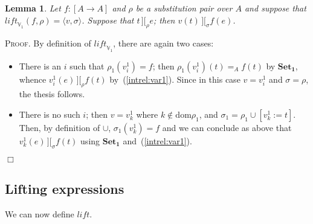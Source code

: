 \documentclass{article}
\newtheorem{lemma}[definition]{Lemma}
\newenvironment{proof}{\smallskip\textsc{Proof.}}{\hspace*{\fill}$\Box$}
\newcommand{\intII}{\,]\![}
\newcommand{\intrel}{\mathbin{\intII_{\rho}}}
\newcommand{\V}{{\mathbb V}}
\newcommand{\axiom}[1]{\ensuremath{\mathbf{#1}}}
\newcommand{\liftv}[1]{\ensuremath{\mathit{lift}_{\V_{#1}}}}
\newcommand{\lift}{\ensuremath{\mathit{lift}}}
\newcommand{\dom}{\ensuremath{\mathrm{dom}}}
\newcommand{\intrels}{\mathbin{\intII_{\sigma}}}
\begin{document}
\begin{lemma}\label{liftv1corr}
Let $f:[A\to A]$ and $\rho$ be a substitution pair over $A$ and suppose
that $\liftv1(f,\rho)=\langle v,\sigma\rangle$.  Suppose that $t\intrel e$;
then $v(t)\intrels f(e)$.
\end{lemma}
\begin{proof}
By definition of \liftv1, there are again two cases:
\begin{itemize}
\item There is an $i$ such that $\rho_1(v^1_i)=f$; then
$\rho_1(v^1_i)(t)=_A f(t)$ by \axiom{Set_1}, whence $v^1_i(e)\intrel
f(t)$ by~(\ref{intrel:var1}).  Since in this case $v=v^1_i$ and
$\sigma=\rho$, the thesis follows.
\item There is no such $i$; then $v=v^1_k$ where $k\not\in\dom\rho_1$,
and $\sigma_1=\rho_1\cup[v^1_k:=t]$.  Then, by definition of $\cup$,
$\sigma_1(v^1_k)=f$ and we can conclude as above that
$v^1_k(e)\intrels f(t)$ using \axiom{Set_1} and~(\ref{intrel:var1}).
\end{itemize}
\end{proof}

\subsection{Lifting expressions}

We can now define $\lift$.
\end{document}
